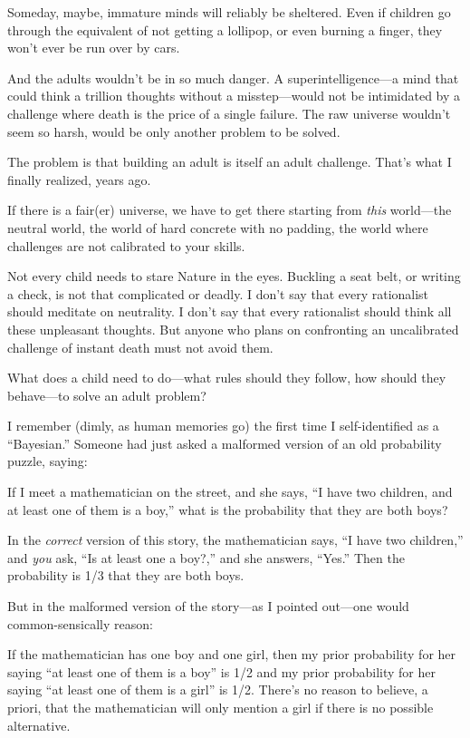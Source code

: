 {
 Someday, maybe, immature minds will reliably be sheltered. Even if
children go through the equivalent of not getting a lollipop, or even
burning a finger, they won't ever be run over by cars.}

{
 And the adults wouldn't be in so much danger. A
superintelligence---a mind that could think a trillion thoughts without
a misstep---would not be intimidated by a challenge where death is the
price of a single failure. The raw universe wouldn't
seem so harsh, would be only another problem to be solved.}

{
 The problem is that building an adult is itself an adult
challenge. That's what I finally realized, years ago.}

{
 If there is a fair(er) universe, we have to get there starting
from \textit{this} world---the neutral world, the world of hard
concrete with no padding, the world where challenges are not calibrated
to your skills.}

{
 Not every child needs to stare Nature in the eyes. Buckling a seat
belt, or writing a check, is not that complicated or deadly. I
don't say that every rationalist should meditate on
neutrality. I don't say that every rationalist should
think all these unpleasant thoughts. But anyone who plans on
confronting an uncalibrated challenge of instant death must not avoid
them.}

{
 What does a child need to do---what rules should they follow, how
should they behave---to solve an adult problem?}

\myendsectiontext


{
 I remember (dimly, as human memories go) the first time I
self-identified as a ``Bayesian.''
Someone had just asked a malformed version of an old probability
puzzle, saying:}

{
 If I meet a mathematician on the street, and she says,
``I have two children, and at least one of them is a
boy,'' what is the probability that they are both
boys?}

{
 In the \textit{correct} version of this story, the mathematician
says, ``I have two children,'' and
\textit{you} ask, ``Is at least one a
boy?,'' and she answers,
``Yes.'' Then the probability is 1/3
that they are both boys.}

{
 But in the malformed version of the story---as I pointed out---one
would common-sensically reason:}

{
 If the mathematician has one boy and one girl, then my prior
probability for her saying ``at least one of them is a
boy'' is 1/2 and my prior probability for her saying
``at least one of them is a girl''
is 1/2. There's no reason to believe, a priori, that
the mathematician will only mention a girl if there is no possible
alternative.}

